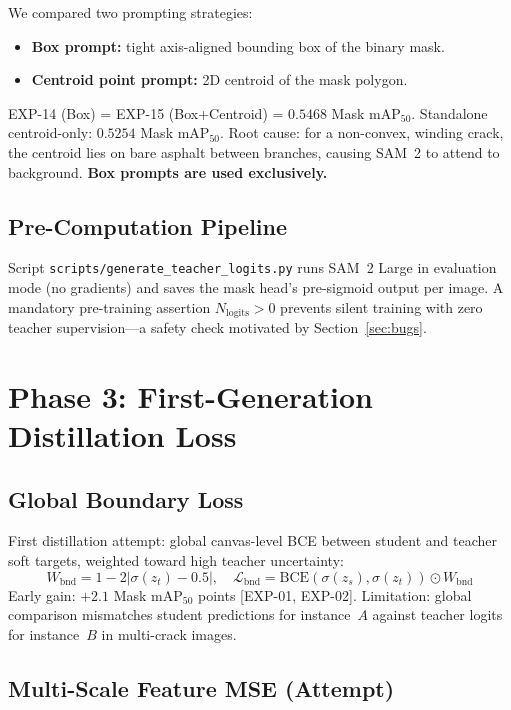 \documentclass[12pt,a4paper]{article}
\begin{document}
We compared two prompting strategies:
\begin{itemize}
  \item \textbf{Box prompt:} tight axis-aligned bounding box of the binary mask.
  \item \textbf{Centroid point prompt:} 2D centroid of the mask polygon.
\end{itemize}
EXP-14 (Box) = EXP-15 (Box+Centroid) = $0.5468$ Mask mAP$_{50}$.
Standalone centroid-only: $0.5254$ Mask mAP$_{50}$.
Root cause: for a non-convex, winding crack, the centroid lies on bare asphalt
between branches, causing SAM~2 to attend to background.
\textbf{Box prompts are used exclusively.}

\subsection{Pre-Computation Pipeline}

Script \texttt{scripts/generate\_teacher\_logits.py} runs SAM~2 Large in
evaluation mode (no gradients) and saves the mask head's pre-sigmoid output per
image.
A mandatory pre-training assertion $N_\text{logits}>0$ prevents silent
training with zero teacher supervision---a safety check motivated by
Section~\ref{sec:bugs}.

\section{Phase 3: First-Generation Distillation Loss}
\label{sec:phase3}

\subsection{Global Boundary Loss}

First distillation attempt: global canvas-level BCE between student and
teacher soft targets, weighted toward high teacher uncertainty:
\[
W_\text{bnd} = 1 - 2|\sigma(z_t)-0.5|,\quad
\mathcal{L}_\text{bnd} = \mathrm{BCE}(\sigma(z_s),\sigma(z_t))\odot W_\text{bnd}
\]
Early gain: $+2.1$ Mask mAP$_{50}$ points [EXP-01, EXP-02].
Limitation: global comparison mismatches student predictions for instance~$A$
against teacher logits for instance~$B$ in multi-crack images.

\subsection{Multi-Scale Feature MSE (Attempt)}
\label{sec:feat_mse}
\end{document}
